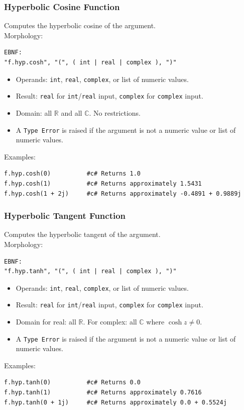 \subsubsection{Hyperbolic Cosine Function}
Computes the hyperbolic cosine of the argument. \\
Morphology:
\begin{verbatim}
EBNF:
"f.hyp.cosh", "(", ( int | real | complex ), ")"
\end{verbatim}
\begin{itemize}
\item Operands: \texttt{int}, \texttt{real}, \texttt{complex}, or list of numeric values.
\item Result: \texttt{real} for \texttt{int}/\texttt{real} input, \texttt{complex} for \texttt{complex} input.
\item Domain: all $\mathbb{R}$ and all $\mathbb{C}$. No restrictions.
\item A \texttt{Type Error} is raised if the argument is not a numeric value or list of numeric values.
\end{itemize}
Examples:
\begin{verbatim}
f.hyp.cosh(0)          #c# Returns 1.0
f.hyp.cosh(1)          #c# Returns approximately 1.5431
f.hyp.cosh(1 + 2j)     #c# Returns approximately -0.4891 + 0.9889j
\end{verbatim}

\subsubsection{Hyperbolic Tangent Function}
Computes the hyperbolic tangent of the argument. \\
Morphology:
\begin{verbatim}
EBNF:
"f.hyp.tanh", "(", ( int | real | complex ), ")"
\end{verbatim}
\begin{itemize}
\item Operands: \texttt{int}, \texttt{real}, \texttt{complex}, or list of numeric values.
\item Result: \texttt{real} for \texttt{int}/\texttt{real} input, \texttt{complex} for \texttt{complex} input.
\item Domain for real: all $\mathbb{R}$. For complex: all $\mathbb{C}$ where $\cosh z \neq 0$.
\item A \texttt{Type Error} is raised if the argument is not a numeric value or list of numeric values.
\end{itemize}
Examples:
\begin{verbatim}
f.hyp.tanh(0)          #c# Returns 0.0
f.hyp.tanh(1)          #c# Returns approximately 0.7616
f.hyp.tanh(0 + 1j)     #c# Returns approximately 0.0 + 0.5524j
\end{verbatim}

